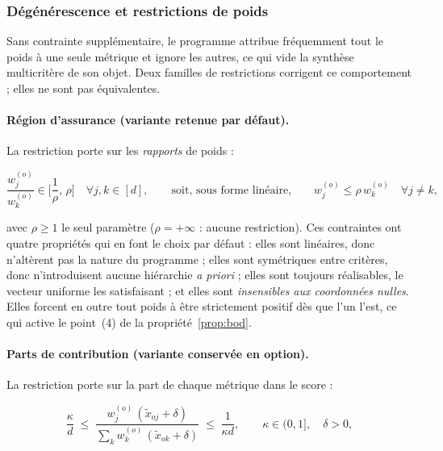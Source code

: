 \documentclass[11pt,a4paper]{article}
\theoremstyle{definition}
\theoremstyle{remark}
\begin{document}
\bigskip

\subsubsection{Dégénérescence et restrictions de poids}
\label{sec:bod-restrictions}

\medskip

Sans contrainte supplémentaire, le programme attribue fréquemment tout le poids à une
seule métrique et ignore les autres, ce qui vide la synthèse multicritère de son objet.
Deux familles de restrictions corrigent ce comportement ; elles ne sont pas
équivalentes.

\bigskip

\paragraph{Région d'assurance (variante retenue par défaut).} La restriction porte sur les
\emph{rapports} de poids :

\medskip

\[
  \frac{w^{(o)}_j}{w^{(o)}_k} \in \Big[\frac{1}{\rho},\, \rho\Big]
  \quad \forall j,k \in [d],
  \qquad\text{soit, sous forme linéaire,}\qquad
  w^{(o)}_j \le \rho\, w^{(o)}_k \quad \forall j \ne k,
\]

\bigskip

avec $\rho \ge 1$ le seul paramètre ($\rho = +\infty$ : aucune restriction). Ces
contraintes ont quatre propriétés qui en font le choix par défaut : elles sont linéaires,
donc n'altèrent pas la nature du programme ; elles sont symétriques entre critères, donc
n'introduisent aucune hiérarchie \emph{a priori} ; elles sont toujours réalisables, le
vecteur uniforme les satisfaisant ; et elles sont \emph{insensibles aux coordonnées
nulles}. Elles forcent en outre tout poids à être strictement positif dès que l'un l'est,
ce qui active le point~(4) de la propriété~\ref{prop:bod}.

\bigskip

\paragraph{Parts de contribution (variante conservée en option).} La restriction porte sur
la part de chaque métrique dans le score :

\medskip

\[
  \frac{\kappa}{d}
  \;\le\; \frac{w^{(o)}_j\,(\tilde{x}_{oj} + \delta)}
               {\sum_k w^{(o)}_k\,(\tilde{x}_{ok} + \delta)}
  \;\le\; \frac{1}{\kappa d},
  \qquad \kappa \in (0,1],\quad \delta > 0,
\]
\end{document}
